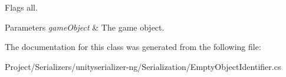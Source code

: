 Flags all. 


\begin{DoxyParams}{Parameters}
{\em game\+Object} & The game object.\\
\hline
\end{DoxyParams}


The documentation for this class was generated from the following file\+:\begin{DoxyCompactItemize}
\item 
Project/\+Serializers/unityserializer-\/ng/\+Serialization/Empty\+Object\+Identifier.\+cs\end{DoxyCompactItemize}
